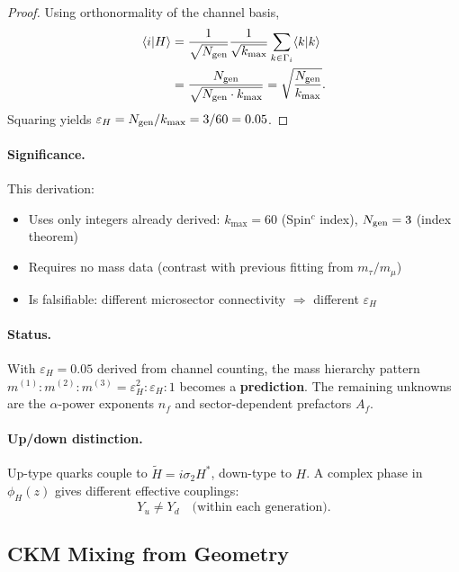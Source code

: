 \begin{proof}
Using orthonormality of the channel basis,
\begin{align}
\langle i|H\rangle
&= \frac{1}{\sqrt{N_{\rm gen}}}\frac{1}{\sqrt{k_{\max}}}
   \sum_{k\in\Gamma_i}\langle k|k\rangle \nonumber\\
&= \frac{N_{\rm gen}}{\sqrt{N_{\rm gen} \cdot k_{\max}}}
= \sqrt{\frac{N_{\rm gen}}{k_{\max}}}.
\end{align}
Squaring yields $\varepsilon_H = N_{\rm gen}/k_{\max} = 3/60 = 0.05$.
\end{proof}

\paragraph{Significance.}
This derivation:
\begin{itemize}
\item Uses only integers already derived: $k_{\max} = 60$ (Spin$^c$ index), 
      $N_{\rm gen} = 3$ (index theorem)
\item Requires no mass data (contrast with previous fitting from $m_\tau/m_\mu$)
\item Is falsifiable: different microsector connectivity $\Rightarrow$ different $\varepsilon_H$
\end{itemize}

\paragraph{Status.}
With $\varepsilon_H = 0.05$ derived from channel counting, the mass hierarchy 
pattern $m^{(1)} : m^{(2)} : m^{(3)} = \varepsilon_H^2 : \varepsilon_H : 1$ becomes 
a \textbf{prediction}. The remaining unknowns are the $\alpha$-power exponents 
$n_f$ and sector-dependent prefactors $A_f$.

\paragraph{Up/down distinction.}
Up-type quarks couple to $\tilde{H} = i\sigma_2 H^*$, down-type to $H$. A complex phase in $\phi_H(z)$ gives different effective couplings:
\begin{equation}
Y_u \neq Y_d \quad \text{(within each generation)}.
\end{equation}

\subsection{CKM Mixing from Geometry}\label{app:ckm}

